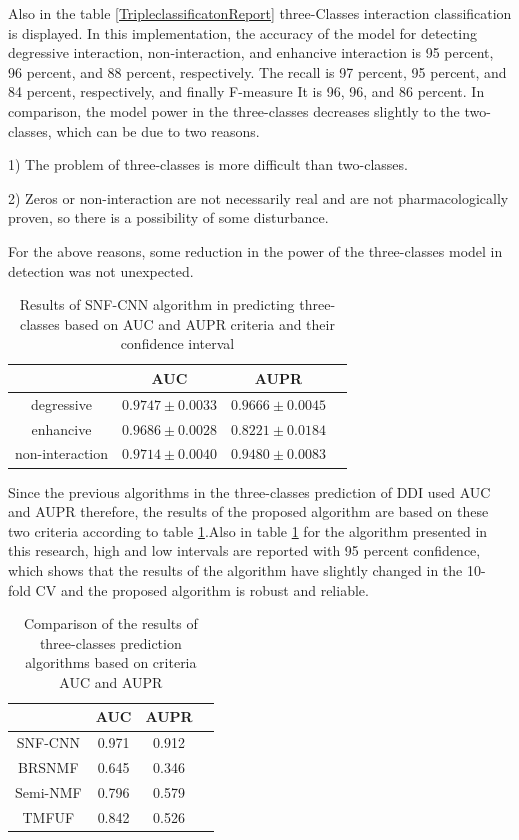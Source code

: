 \documentclass{bmcart}
\begin{document}
Also in the table
\ref{TripleclassificatonReport}
three-Classes interaction classification is displayed. In this implementation, the accuracy of the model for detecting degressive interaction, non-interaction, and enhancive interaction is 95 percent, 96 percent, and 88 percent, respectively. The recall is 97 percent, 95 percent, and 84 percent, respectively, and finally F-measure It is 96, 96, and 86 percent. In comparison, the model power in the three-classes decreases slightly to the two-classes, which can be due to two reasons.

1) The problem of three-classes is more difficult than two-classes.

2) Zeros or non-interaction are not necessarily real and are not pharmacologically proven, so there is a possibility of some disturbance.

For the above reasons, some reduction in the power of the three-classes model in detection was not unexpected.

\begin{table}[h!]
\centering 
\begin{tabular}{|c|c|c|c|}
\hline
& AUC & AUPR\\
\hline
degressive	& $0.9747 \pm 0.0033$ & $0.9666 \pm 0.0045$\\
\hline
enhancive  & $0.9686 \pm 0.0028$ & $0.8221 \pm 0.0184$\\
\hline
non-interaction & $0.9714 \pm 0.0040$ & $0.9480 \pm 0.0083$\\
\hline
\end{tabular}
\newline
	\caption{Results of SNF-CNN algorithm in predicting three-classes based on AUC and AUPR criteria and their confidence interval}
	\label{SNF-CNNresult}
\end{table}

Since the previous algorithms in the three-classes prediction of DDI used AUC and AUPR therefore, the results of the proposed algorithm are based on these two criteria according to table
\ref{SNF-CNNresult}.Also in table
\ref{SNF-CNNresult}
for the algorithm presented in this research, high and low intervals are reported with 95 percent confidence, which shows that the results of the algorithm have slightly changed in the 10- fold CV and the proposed algorithm is robust and reliable.

\begin{table}[h!]
\centering 
\begin{tabular}{|c|c|c|c|}
\hline
& AUC	& AUPR \\
\hline
SNF-CNN	& 0.971 & 0.912\\
\hline
BRSNMF\cite{shi2019detecting}  & 0.645 & 0.346\\
\hline
Semi-NMF \cite{yu2018predicting} & 0.796 & 0.579\\
\hline
TMFUF\cite{shi2018tmfuf}   & 0.842  & 0.526\\
\hline
\end{tabular}
\newline 
	\caption{Comparison of the results of three-classes prediction algorithms based on criteria AUC and AUPR}
	\label{AUCAUPR}
\end{table}
\end{document}
